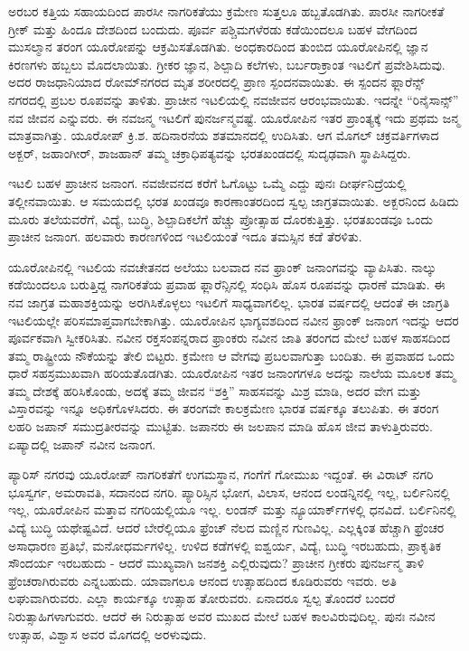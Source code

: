 \vskip 5pt

ಅರಬರ ಕತ್ತಿಯ ಸಹಾಯದಿಂದ ಪಾರಸೀ ನಾಗರಿಕತೆಯು ಕ್ರಮೇಣ ಸುತ್ತಲೂ ಹಬ್ಬತೊಡಗಿತು. ಪಾರಸೀ ನಾಗರೀಕತೆ ಗ್ರೀಕ್​ ಮತ್ತು ಹಿಂದೂ ದೇಶದಿಂದ ಬಂದುದು. ಪೂರ್ವ ಪಶ್ಚಿಮಗಳೆರಡು ಕಡೆಯಿಂದಲೂ ಬಹಳ ವೇಗದಿಂದ ಮುಸಲ್ಮಾನ ತರಂಗ ಯೂರೋಪನ್ನು ಆಕ್ರಮಿಸತೊಡಗಿತು. ಅಂಧಕಾರದಿಂದ ತುಂಬಿದ ಯೂರೋಪಿನಲ್ಲಿ ಜ್ಞಾನ ಕಿರಣಗಳು ಹಬ್ಬಲು ಮೊದಲಾಯಿತು. ಗ್ರೀಕರ ಜ್ಞಾನ, ಶಿಲ್ಪಾದಿ ಕಲೆಗಳು, ಬರ್ಬರಾ\break ಕ್ರಾಂತ ಇಟಲಿಗೆ ಪ್ರವೇಶಿಸಿದುವು. ಅದರ ರಾಜಧಾನಿಯಾದ ರೋಮ್​ನಗರದ ಮೃತ ಶರೀರದಲ್ಲಿ ಪ್ರಾಣ ಸ್ಪಂದನವಾಯಿತು. ಈ ಸ್ಪಂದನ ಫ್ಲಾರೆನ್ಸ್​ ನಗರದಲ್ಲಿ ಪ್ರಬಲ ರೂಪವನ್ನು ತಾಳಿತು. ಪ್ರಾಚೀನ ಇಟಲಿಯಲ್ಲಿ ನವಜೀವನ ಆರಂಭವಾಯಿತು. ಇದನ್ನೇ “ರಿನೈಸಾನ್ಸ್​” ನವ ಜೀವನ ಎನ್ನುವರು. ಈ ನವಜನ್ಮ ಇಟಲಿಗೆ ಪುನರ್ಜನ್ಮವಷ್ಟೆ. ಯೂರೋಪಿನ ಇತರ ಪ್ರಾಂತ್ಯಕ್ಕೆ ಇದು ಪ್ರಥಮ ಜನ್ಮ ಮಾತ್ರವಾಗಿತ್ತು. ಯೂರೋಪ್​ ಕ್ರಿ.ಶ. ಹದಿನಾರನೆಯ ಶತಮಾನದಲ್ಲಿ ಉದಿಸಿತು. ಆಗ ಮೊಗಲ್​ ಚಕ್ರವರ್ತಿಗಳಾದ ಅಕ್ಬರ್​, ಜಹಾಂಗೀರ್​, ಶಾಜಹಾನ್​ ತಮ್ಮ ಚಕ್ರಾಧಿಪತ್ಯವನ್ನು ಭರತಖಂಡದಲ್ಲಿ ಸುದೃಢವಾಗಿ ಸ್ಥಾಪಿಸಿದ್ದರು.

\vskip 5pt

ಇಟಲಿ ಬಹಳ ಪ್ರಾಚೀನ ಜನಾಂಗ. ನವಜೀವನದ ಕರೆಗೆ ಓಗೊಟ್ಟು ಒಮ್ಮೆ ಎದ್ದು ಪುನಃ ದೀರ್ಘನಿದ್ರೆಯಲ್ಲಿ ತಲ್ಲೀನವಾಯಿತು. ಆ ಸಮಯದಲ್ಲಿ ಭರತ ಖಂಡವೂ ಕಾರಣಾಂತರ\break ದಿಂದ ಸ್ವಲ್ಪ ಜಾಗ್ರತವಾಯಿತು. ಅಕ್ಬರನಿಂದ ಹಿಡಿದು ಮೂರು ತಲೆಯವರೆಗೆ, ವಿದ್ಯೆ, ಬುದ್ಧಿ, ಶಿಲ್ಪಾದಿಕಲೆಗೆ ಹೆಚ್ಚು ಪ್ರೋತ್ಸಾಹ ದೊರಕುತ್ತಿತ್ತು. ಭರತಖಂಡವೂ ಒಂದು ಪ್ರಾಚೀನ ಜನಾಂಗ. ಹಲವಾರು ಕಾರಣಗಳಿಂದ ಇಟಲಿಯಂತೆ ಇದೂ ತಮಸ್ಸಿನ ಕಡೆ ತೆರಳಿತು.

\vskip 5pt

ಯೂರೋಪಿನಲ್ಲಿ ಇಟಲಿಯ ನವಚೇತನದ ಅಲೆಯು ಬಲವಾದ ನವ ಫ್ರಾಂಕ್​ ಜನಾಂಗವನ್ನು ವ್ಯಾಪಿಸಿತು. ನಾಲ್ಕು ಕಡೆಯಿಂದಲೂ ಬರುತ್ತಿದ್ದ ನಾಗರಿಕತೆಯ ಪ್ರವಾಹ ಫ್ಲಾರೆನ್ಸಿನಲ್ಲಿ ಸಂಧಿಸಿ ಹೊಸ ರೂಪವನ್ನು ಧಾರಣೆ ಮಾಡಿತು. ಈ ನವ ಜಾಗ್ರತ ಮಹಾಶಕ್ತಿಯನ್ನು ಅರಗಿಸಿಕೊಳ್ಳಲು ಇಟಲಿಗೆ ಸಾಧ್ಯವಾಗಲಿಲ್ಲ. ಭಾರತ ವರ್ಷದಲ್ಲಿ ಆದಂತೆ ಈ ಜಾಗ್ರತಿ ಇಟಲಿಯಲ್ಲೇ ಪರಿಸಮಾಪ್ತವಾಗಬೇಕಾಗಿತ್ತು. ಯೂರೋಪಿನ ಭಾಗ್ಯವಶದಿಂದ ನವೀನ ಫ್ರಾಂಕ್​ ಜನಾಂಗ ಇದನ್ನು ಆದರ ಪೂರ್ವಕವಾಗಿ ಸ್ವೀಕರಿಸಿತು. ನವೀನ ರಕ್ತಸಂಪನ್ನ\break ರಾದ ಫ್ರಾಂಕರು ನವೀನ ಜಾತಿ ತರಂಗದ ಮೇಲೆ ಬಹಳ ಸಾಹಸದಿಂದ ತಮ್ಮ ರಾಷ್ಟ್ರೀಯ ನೌಕೆಯನ್ನು ತೇಲಿ ಬಿಟ್ಟರು. ಕ್ರಮೇಣ ಆ ವೇಗವು ಪ್ರಬಲವಾಗುತ್ತಾ ಬಂದಿತು. ಈ ಪ್ರವಾಹದ ಒಂದು ಧಾರೆ ಸಹಸ್ರಮುಖವಾಗಿ ಹರಿಯತೊಡಗಿತು. ಯೂರೋಪಿನ ಇತರ ಜನಾಂಗಗಳೂ ಅದನ್ನು ನಾಲೆಯ ಮೂಲಕ ತಮ್ಮ ತಮ್ಮ ದೇಶಕ್ಕೆ ಹರಿಸಿಕೊಂಡು, ಅದಕ್ಕೆ ತಮ್ಮ ಜೀವನ “ಶಕ್ತಿ” ಸಾಹಸವನ್ನು ಮಿಶ್ರ ಮಾಡಿ, ಅದರ ವೇಗ ಮತ್ತು ವಿಸ್ತಾರವನ್ನು ಇನ್ನೂ ಅಧಿಕಗೊಳಸಿದರು. ಈ ತರಂಗವೇ ಕಾಲಕ್ರಮೇಣ ಭಾರತ ವರ್ಷಕ್ಕೂ ತಲುಪಿತು. ಈ ತರಂಗ ಲಹರಿ ಜಪಾನ್​ ಸಮುದ್ರತೀರವನ್ನು ಮುಟ್ಟಿತು. ಜಪಾನರು ಈ ಜಲಪಾನ ಮಾಡಿ ಹೊಸ ಜೀವ ತಾಳುತ್ತಿರುವರು. ಏಷ್ಯಾದಲ್ಲಿ ಜಪಾನ್​ ನವೀನ ಜನಾಂಗ.

\vskip 5pt

ಪ್ಯಾರಿಸ್​ ನಗರವು ಯೂರೋಪ್​ ನಾಗರಿಕತೆಗೆ ಉಗಮಸ್ಥಾನ, ಗಂಗೆಗೆ ಗೋಮುಖ ಇದ್ದಂತೆ. ಈ ವಿರಾಟ್​ ನಗರಿ ಭೂಸ್ವರ್ಗ, ಅಮರಾವತಿ, ಸದಾನಂದ ನಗರಿ. ಪ್ಯಾರಿಸ್ಸಿನ ಭೋಗ, ವಿಲಾಸ, ಆನಂದ ಲಂಡನ್ನಿನಲ್ಲಿ ಇಲ್ಲ, ಬರ್ಲಿನಿನಲ್ಲಿ ಇಲ್ಲ, ಯೂರೋಪಿನ ಮತ್ತಾವ ನಗರಿಯಲ್ಲಿಯೂ ಇಲ್ಲ. ಲಂಡನ್​ ಮತ್ತು ನ್ಯೂಯಾರ್ಕ್​ಗಳಲ್ಲಿ ಧನವಿದೆ. ಬರ್ಲಿನಿನಲ್ಲಿ ವಿದ್ಯೆ ಬುದ್ಧಿ ಯಥೇಷ್ಟವಿದೆ. ಆದರೆ ಬೇರೆಲ್ಲಿಯೂ ಫ್ರೆಂಚ್​ ನೆಲದ ಮಣ್ಣಿನ ಗುಣವಿಲ್ಲ. ಎಲ್ಲಕ್ಕಿಂತ ಹೆಚ್ಚಾಗಿ ಫ್ರೆಂಚರ ಅಸಾಧಾರಣ ಪ್ರತಿಭೆ, ಮನೋಧರ್ಮಗಳಿಲ್ಲ. ಉಳಿದ ಕಡೆಗಳಲ್ಲಿ ಐಶ್ವರ್ಯ, ವಿದ್ಯೆ, ಬುದ್ಧಿ ಇರಬಹುದು, ಪ್ರಾಕೃತಿಕ ಸೌಂದರ್ಯ ಇರಬಹುದು - ಆದರೆ ಮುಖ್ಯವಾಗಿ ಜನಶಕ್ತಿ ಎಲ್ಲಿರುವುದು? ಪ್ರಾಚೀನ ಗ್ರೀಕರು ಪುನರ್ಜನ್ಮ ತಾಳಿ ಫ್ರೆಂಚರಾಗಿರುವರು ಎನ್ನಬಹುದು. ಯಾವಾಗಲೂ ಆನಂದ ಉತ್ಸಾಹದಿಂದ ಕೂಡಿರುವರು ಇವರು. ಅತಿ ಲಘುವಾಗಿರುವರು. ಎಲ್ಲಾ ಕಾರ್ಯಕ್ಕೂ ಉತ್ಸಾಹ ತೋರುವರು. ಏನಾದರೂ ಸ್ವಲ್ಪ ತೊಂದರೆ ಬಂದರೆ ನಿರುತ್ಸಾಹಿಗಳಾಗುವರು. ಆದರೆ ಈ ನಿರುತ್ಸಾಹ ಅವರ ಮುಖದ ಮೇಲೆ ಬಹಳ ಕಾಲವಿರುವುದಿಲ್ಲ. ಪುನಃ ನವೀನ ಉತ್ಸಾಹ, ವಿಶ್ವಾಸ ಅವರ ಮೊಗದಲ್ಲಿ ಅರಳುವುದು.

